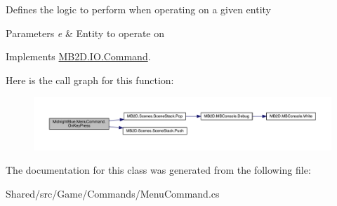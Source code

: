 Defines the logic to perform when operating on a given entity 


\begin{DoxyParams}{Parameters}
{\em e} & Entity to operate on\\
\hline
\end{DoxyParams}


Implements \hyperlink{class_m_b2_d_1_1_i_o_1_1_command_ae927e36c0e285848325cc68eddb5fd72}{M\+B2\+D.\+I\+O.\+Command}.

Here is the call graph for this function\+:\nopagebreak
\begin{figure}[H]
\begin{center}
\leavevmode
\includegraphics[width=350pt]{class_midnight_blue_1_1_menu_command_a2101f922aa12bd7fed4eff3eb714a9d4_cgraph}
\end{center}
\end{figure}


The documentation for this class was generated from the following file\+:\begin{DoxyCompactItemize}
\item 
Shared/src/\+Game/\+Commands/Menu\+Command.\+cs\end{DoxyCompactItemize}
